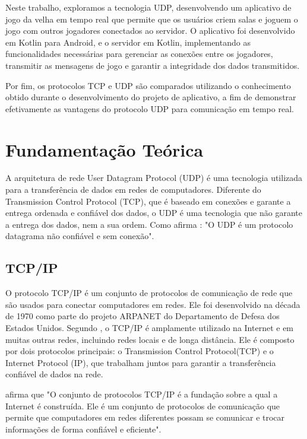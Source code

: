 \documentclass[12pt]{article}
\begin{document}
Neste trabalho, exploramos a tecnologia UDP, desenvolvendo um aplicativo de jogo da velha em tempo real que permite que os usuários criem salas e joguem o jogo com outros jogadores conectados ao servidor. O aplicativo foi desenvolvido em Kotlin para Android, e o servidor em Kotlin, implementando as funcionalidades necessárias para gerenciar as conexões entre os jogadores, transmitir as mensagens de jogo e garantir a integridade dos dados transmitidos.

Por fim, os protocolos TCP e UDP são comparados utilizando o conhecimento obtido durante o desenvolvimento do projeto de aplicativo, a fim de demonstrar efetivamente as vantagens do protocolo UDP para comunicação em tempo real.

\section{Fundamentação Teórica} \label{sec:firstpage}

A arquitetura de rede User Datagram Protocol (UDP) é uma tecnologia utilizada para a transferência de dados em redes de computadores. Diferente do Transmission Control Protocol (TCP), que é baseado em conexões e garante a entrega ordenada e confiável dos dados, o UDP é uma tecnologia que não garante a entrega dos dados, nem a sua ordem. Como afirma \cite{kurose2013computer}: "O UDP é um protocolo datagrama não confiável e sem conexão".

\subsection{TCP/IP}
O protocolo TCP/IP é um conjunto de protocolos de comunicação de rede que são usados para conectar computadores em redes. Ele foi desenvolvido na década de 1970 como parte do projeto ARPANET do Departamento de Defesa dos Estados Unidos. Segundo \cite{forouzan2018comunicacao}, o TCP/IP é amplamente utilizado na Internet e em muitas outras redes, incluindo redes locais e de longa distância. Ele é composto por dois protocolos principais: o Transmission Control Protocol(TCP) e o Internet Protocol (IP), que trabalham juntos para garantir a transferência confiável de dados na rede.

\cite{neuman2003redes} afirma que "O conjunto de protocolos TCP/IP é a fundação sobre a qual a Internet é construída. Ele é um conjunto de protocolos de comunicação que permite que computadores em redes diferentes possam se comunicar e trocar informações de forma confiável e eficiente".
\end{document}
